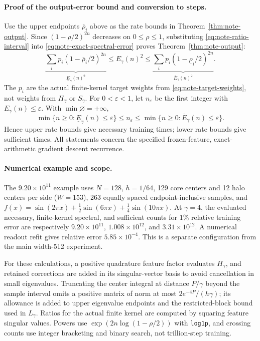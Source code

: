 \paragraph{Proof of the output-error bound and conversion to steps.}
Use the upper endpoints $\overline\rho_i$ above as the rate bounds in
Theorem~\ref{thm:note-output}. Since $(1-\rho/2)^{2n}$ decreases on
$0\le\rho\le1$, substituting
\eqref{eq:note-ratio-interval} into
\eqref{eq:note-exact-spectral-error} proves Theorem~\ref{thm:note-output}:
\begin{equation}
 \underbrace{\sum_i p_i(1-\overline\rho_i/2)^{2n}}_{\underline E_\gamma(n)^2}
 \le E_\gamma(n)^2\le
 \underbrace{\sum_i p_i(1-\underline\rho_i/2)^{2n}}_{\overline E_\gamma(n)^2}.
 \label{eq:note-error-sandwich}
\end{equation}
The $p_i$ are the actual finite-kernel target weights from
\eqref{eq:note-target-weights}, not weights from $H_\gamma$ or $S_\gamma$.
For $0<\varepsilon<1$, let $n_\varepsilon$ be the first integer with
$E_\gamma(n)\le\varepsilon$. With $\min\varnothing=+\infty$,
\begin{equation}
 \min\{n\ge0:\underline E_\gamma(n)\le\varepsilon\}
 \le n_\varepsilon\le
 \min\{n\ge0:\overline E_\gamma(n)\le\varepsilon\}.
 \label{eq:note-step-interval}
\end{equation}
Hence upper rate bounds give necessary training times; lower rate bounds
give sufficient times. All statements concern the specified frozen-feature,
exact-arithmetic gradient descent recurrence.

\paragraph{Numerical example and scope.}
\label{app:note-step-example}
The $9.20\times10^{11}$ example uses $N=128$, $h=1/64$, 129 core
centers and 12 halo centers per side ($W=153$), 263 equally spaced
endpoint-inclusive samples, and
$f(x)=\sin(2\pi x)+\tfrac12\sin(6\pi x)+\tfrac14\sin(10\pi x)$.
At $\gamma=4$, the evaluated necessary, finite-kernel spectral, and
sufficient counts for $1\%$ relative training error are respectively
$9.20\times10^{11}$, $1.008\times10^{12}$, and $3.31\times10^{12}$.
A numerical readout refit gives relative error $5.85\times10^{-4}$.
This is a separate configuration from the main width-512 experiment.

For these calculations, a positive quadrature feature factor evaluates
$H_\gamma$, and retained corrections are added in its singular-vector
basis to avoid cancellation in small eigenvalues. Truncating the center
integral at distance $P/\gamma$ beyond the sample interval omits a positive
matrix of norm at most $2e^{-4P}/(h\gamma)$; its allowance is added to
upper eigenvalue endpoints and the restricted-block bound used in
$L_\gamma$. Ratios for the actual finite kernel are computed by
squaring feature singular values. Powers use
$\exp(2n\log(1-\rho/2))$ with \texttt{log1p}, and crossing counts use
integer bracketing and binary search, not trillion-step training.

